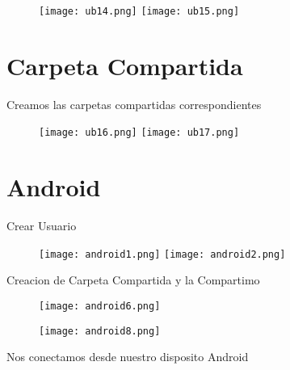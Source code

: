 \documentclass{article}
\begin{document}
\begin{figure}[htp]
\centering
\texttt{[image: ub14.png]}
\texttt{[image: ub15.png]}
\end{figure}

\section{Carpeta Compartida}

\begin{description}
    \item  [Creamos las carpetas compartidas correspondientes]
\end{description}


\begin{figure}[htp]
\centering
\texttt{[image: ub16.png]}
\texttt{[image: ub17.png]}
\end{figure}


\section{Android}

\begin{description}
    \item  [Crear Usuario]
\end{description}


\begin{figure}[htp]
\centering
\texttt{[image: android1.png]}
\texttt{[image: android2.png]}
\end{figure}

\begin{description}
    \item  [Creacion de Carpeta Compartida y la Compartimo]
\end{description}


\begin{figure}[htp]
\centering
\texttt{[image: android6.png]}
\end{figure}


\begin{figure}[htp]
\centering
\texttt{[image: android8.png]}
\end{figure}

\begin{description}
    \item  
\end{description}


\begin{description}
    \item  [Nos conectamos desde nuestro disposito Android]
\end{description}
\end{document}
